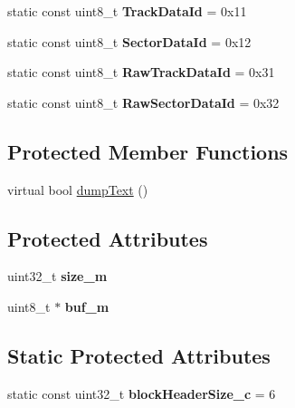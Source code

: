 \begin{DoxyCompactItemize}
\item 
\hypertarget{classH17Block_abba04ea8a19a2c67c52b2044e9d7e6b5}{}static const uint8\+\_\+t {\bfseries Track\+Data\+Id} = 0x11\label{classH17Block_abba04ea8a19a2c67c52b2044e9d7e6b5}

\item 
\hypertarget{classH17Block_aba48bf0cd556e2450f6ae849dee5aa58}{}static const uint8\+\_\+t {\bfseries Sector\+Data\+Id} = 0x12\label{classH17Block_aba48bf0cd556e2450f6ae849dee5aa58}

\item 
\hypertarget{classH17Block_af851d13f0569ae7860ce8e5953bfa5f5}{}static const uint8\+\_\+t {\bfseries Raw\+Track\+Data\+Id} = 0x31\label{classH17Block_af851d13f0569ae7860ce8e5953bfa5f5}

\item 
\hypertarget{classH17Block_a0510af71536a81a626c9956302b744bf}{}static const uint8\+\_\+t {\bfseries Raw\+Sector\+Data\+Id} = 0x32\label{classH17Block_a0510af71536a81a626c9956302b744bf}

\end{DoxyCompactItemize}
\subsection*{Protected Member Functions}
\begin{DoxyCompactItemize}
\item 
virtual bool \hyperlink{classH17Block_a09d4bee92e3b1862412b53a369f9dcc8}{dump\+Text} ()
\end{DoxyCompactItemize}
\subsection*{Protected Attributes}
\begin{DoxyCompactItemize}
\item 
\hypertarget{classH17Block_af5613c8a2286e67b7f8235162453d8c1}{}uint32\+\_\+t {\bfseries size\+\_\+m}\label{classH17Block_af5613c8a2286e67b7f8235162453d8c1}

\item 
\hypertarget{classH17Block_a279340cf9f0dba5b047297e38d430bb1}{}uint8\+\_\+t $\ast$ {\bfseries buf\+\_\+m}\label{classH17Block_a279340cf9f0dba5b047297e38d430bb1}

\end{DoxyCompactItemize}
\subsection*{Static Protected Attributes}
\begin{DoxyCompactItemize}
\item 
\hypertarget{classH17Block_a12fca0c1752b9473f618bd35cac1844f}{}static const uint32\+\_\+t {\bfseries block\+Header\+Size\+\_\+c} = 6\label{classH17Block_a12fca0c1752b9473f618bd35cac1844f}

\end{DoxyCompactItemize}
